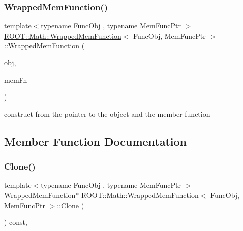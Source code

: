 \subsubsection{\texorpdfstring{WrappedMemFunction()}{WrappedMemFunction()}\hspace{0.1cm}{\footnotesize\ttfamily [3/3]}}
{\footnotesize\ttfamily template$<$typename Func\+Obj , typename Mem\+Func\+Ptr $>$ \\
\mbox{\hyperlink{classROOT_1_1Math_1_1WrappedMemFunction}{R\+O\+O\+T\+::\+Math\+::\+Wrapped\+Mem\+Function}}$<$ Func\+Obj, Mem\+Func\+Ptr $>$\+::\mbox{\hyperlink{classROOT_1_1Math_1_1WrappedMemFunction}{Wrapped\+Mem\+Function}} (\begin{DoxyParamCaption}\item[{Func\+Obj \&}]{obj,  }\item[{Mem\+Func\+Ptr}]{mem\+Fn }\end{DoxyParamCaption})\hspace{0.3cm}{\ttfamily [inline]}}

construct from the pointer to the object and the member function 

\subsection{Member Function Documentation}
\mbox{\label{classROOT_1_1Math_1_1WrappedMemFunction_a6f27e92240e16003ff20c25df6fba1eb}} 
\subsubsection{\texorpdfstring{Clone()}{Clone()}\hspace{0.1cm}{\footnotesize\ttfamily [1/3]}}
{\footnotesize\ttfamily template$<$typename Func\+Obj , typename Mem\+Func\+Ptr $>$ \\
\mbox{\hyperlink{classROOT_1_1Math_1_1WrappedMemFunction}{Wrapped\+Mem\+Function}}$\ast$ \mbox{\hyperlink{classROOT_1_1Math_1_1WrappedMemFunction}{R\+O\+O\+T\+::\+Math\+::\+Wrapped\+Mem\+Function}}$<$ Func\+Obj, Mem\+Func\+Ptr $>$\+::Clone (\begin{DoxyParamCaption}{ }\end{DoxyParamCaption}) const\hspace{0.3cm}{\ttfamily [inline]}, {\ttfamily [virtual]}}



